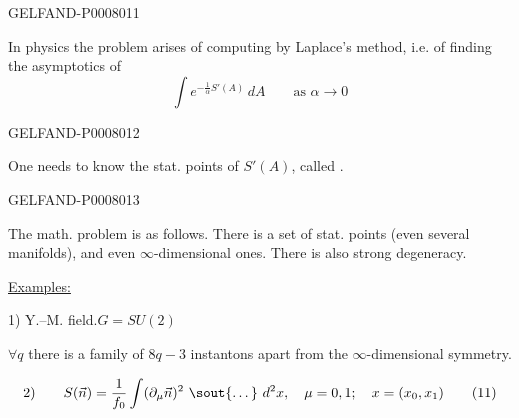 \begin{GelfandAdjacentEvidence}{GELFAND-P000801}{1}

In physics the problem arises of computing by Laplace’s method, i.e. of finding the asymptotics of
\begin{equation*}
\int e^{-\frac{1}{\alpha}S'(A)}\,dA\qquad
\text{as }\alpha\to0
\tag{10}
\end{equation*}
\end{GelfandAdjacentEvidence}
\begin{GelfandAdjacentEvidence}{GELFAND-P000801}{2}


One needs to know the stat. points of \(S'(A)\), called .
\end{GelfandAdjacentEvidence}
\begin{GelfandAdjacentEvidence}{GELFAND-P000801}{3}


The math. problem is as follows. There is a set of stat. points (even several manifolds), and even \(\infty\)-dimensional ones. There is also strong degeneracy.

\underline{Examples:}

1) Y.–M. field.\qquad \(G=SU(2)\)

\(\forall q\) there is a family of \(8q-3\) instantons apart from the \(\infty\)-dimensional symmetry.

\begin{equation*}
2)\qquad S(\vec n)=\frac{1}{f_0}\int(\partial_\mu\vec n)^2
\ \text{\sout{\ldots}}\ d^2x,
\quad \mu=0,1;\quad x=(x_0,x_1)
\tag{11}
\end{equation*}
\end{GelfandAdjacentEvidence}
